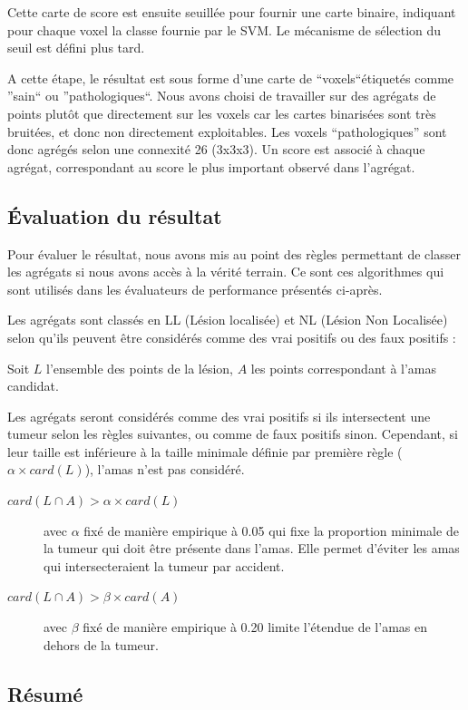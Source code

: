 Cette carte de score est ensuite seuillée pour fournir une carte binaire, indiquant pour chaque voxel la classe fournie par le SVM. Le mécanisme de sélection du seuil est défini plus tard. 

A cette étape, le résultat est sous forme d'une carte de ``voxels``étiquetés comme ''sain`` ou ''pathologiques``. Nous avons choisi de travailler sur des agrégats de points plutôt que directement sur les voxels car les cartes binarisées sont très bruitées, et donc non directement exploitables. Les voxels ``pathologiques'' sont donc agrégés selon une connexité 26 (3x3x3). Un score est associé à chaque  agrégat, correspondant au score le plus important observé dans l'agrégat.

\subsection{Évaluation du résultat}

Pour évaluer le résultat, nous avons mis au point des règles permettant de classer les agrégats si nous avons accès à la vérité terrain. Ce sont ces algorithmes qui sont utilisés dans les évaluateurs de performance présentés ci-après.

Les agrégats sont classés en LL (Lésion localisée) et NL (Lésion Non Localisée) selon qu'ils peuvent être considérés comme des vrai positifs ou des faux positifs :

Soit $L$ l'ensemble des points de la lésion, $A$ les points correspondant à l'amas candidat.

Les agrégats seront considérés comme des vrai positifs si ils intersectent une tumeur selon les règles suivantes, ou comme de faux positifs sinon. Cependant, si leur taille est inférieure à la taille minimale définie par première règle ($\alpha \times card( L )$), l'amas n'est pas considéré.

\begin{description}
 \item[$card( L \cap A ) > \alpha \times card( L )$] avec $\alpha$ fixé de manière empirique à 0.05 qui fixe la proportion minimale de la tumeur qui doit être présente dans l'amas. Elle permet d'éviter les amas qui intersecteraient la tumeur par accident.
 \item[$card( L \cap A ) > \beta \times card( A )$]  avec $\beta$ fixé de manière empirique à 0.20 limite l'étendue de l'amas en dehors de la tumeur.
\end{description}


\subsection{Résumé}

